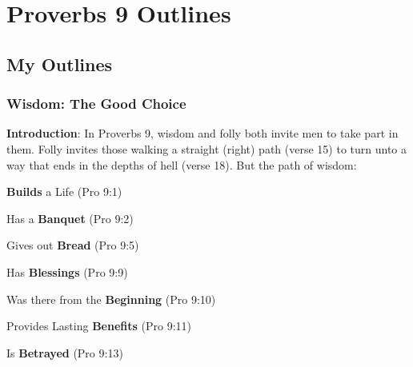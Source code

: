 \section{Proverbs 9 Outlines}

\subsection{My Outlines}

\subsubsection{Wisdom: The Good Choice}
\textbf{Introduction}: In Proverbs 9, wisdom and folly both invite men to take part in them. Folly invites those walking a straight (right) path (verse 15) to turn unto a way that ends in the depths of hell (verse 18).  But the path of wisdom:
\begin{compactenum}[I.]
\item \textbf{Builds} a Life (Pro 9:1)
\item Has a \textbf{Banquet} (Pro 9:2)
\item Gives out \textbf{Bread} (Pro 9:5)
\item Has \textbf{Blessings} (Pro 9:9)
\item Was there from the \textbf{Beginning} (Pro 9:10)
\item Provides Lasting \textbf{Benefits} (Pro 9:11)
\item Is \textbf{Betrayed} (Pro 9:13)
\end{compactenum}

